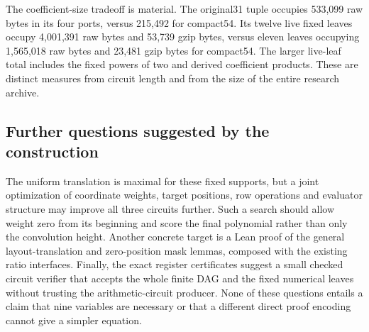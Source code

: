 The coefficient-size tradeoff is material.  The original31 tuple occupies
533,099 raw bytes in its four ports, versus 215,492 for compact54.
Its twelve live fixed leaves occupy 4,001,391 raw bytes and 53,739 gzip
bytes, versus eleven leaves occupying 1,565,018 raw bytes and 23,481 gzip
bytes for compact54.  The larger live-leaf total includes the fixed powers
of two and derived coefficient products.  These are distinct measures
from circuit length and from the size of the entire research archive.

\subsection{Further questions suggested by the construction}

The uniform translation is maximal for these fixed supports, but a joint
optimization of coordinate weights, target positions, row operations and
evaluator structure may improve all three circuits further.  Such a search
should allow weight zero from its beginning and score the final polynomial
rather than only the convolution height.  Another concrete target is a
Lean proof of the general layout-translation and zero-position mask lemmas,
composed with the existing ratio interfaces.  Finally, the exact register
certificates suggest a small checked circuit verifier that accepts the
whole finite DAG and the fixed numerical leaves without trusting the
arithmetic-circuit producer.  None of these questions entails a claim that
nine variables are necessary or that a different direct proof encoding
cannot give a simpler equation.
